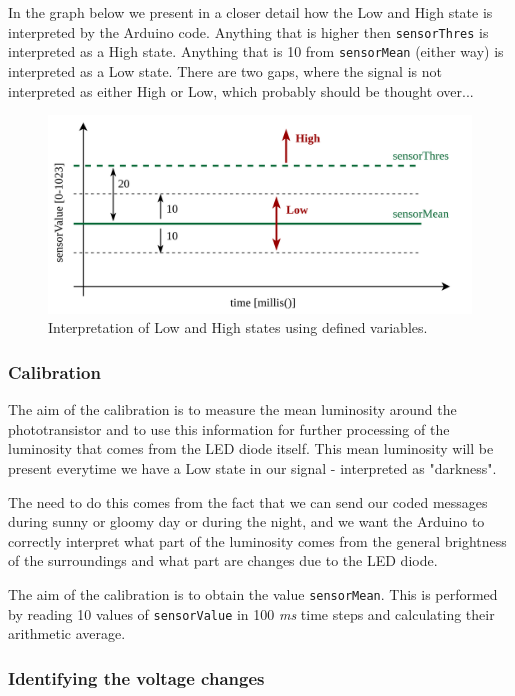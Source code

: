 \documentclass[12pt]{report}
\begin{document}
In the graph below we present in a closer detail how the Low and High state is interpreted by the Arduino code. Anything that is higher then \verb|sensorThres| is interpreted as a High state. Anything that is 10 from \verb|sensorMean| (either way) is interpreted as a Low state. There are two gaps, where the signal is not interpreted as either High or Low, which probably should be thought over...

\begin{figure}[H]
\centering\includegraphics[scale=0.18]{arduinocode}
\caption{Interpretation of Low and High states using defined variables.}				
\label{fig:arduino_code}
\end{figure}



\subsubsection{Calibration}

The aim of the calibration is to measure the mean luminosity around the phototransistor and to use this information for further processing of the luminosity that comes from the LED diode itself. This mean luminosity will be present everytime we have a Low state in our signal - interpreted as "darkness".

The need to do this comes from the fact that we can send our coded messages during sunny or gloomy day or during the night, and we want the Arduino to correctly interpret what part of the luminosity comes from the general brightness of the surroundings and what part are changes due to the LED diode.

The aim of the calibration is to obtain the value \verb|sensorMean|. This is performed by reading 10 values of \verb|sensorValue| in 100 \textit{ms} time steps and calculating their arithmetic average.

\subsubsection{Identifying the voltage changes}
\end{document}

